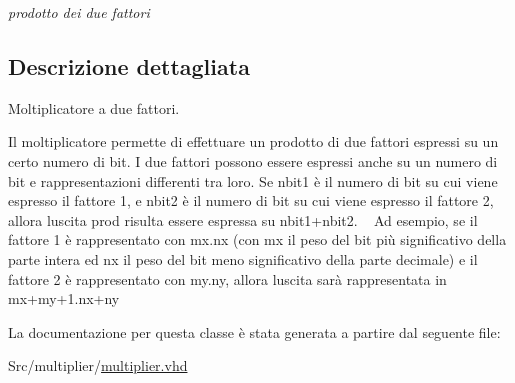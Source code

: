 \begin{DoxyCompactItemize}
\begin{DoxyCompactList}\small\item\em prodotto dei due fattori \end{DoxyCompactList}\end{DoxyCompactItemize}


\subsection{Descrizione dettagliata}
Moltiplicatore a due fattori.

Il moltiplicatore permette di effettuare un prodotto di due fattori espressi su un certo numero di bit. I due fattori possono essere espressi anche su un numero di bit e rappresentazioni differenti tra loro. Se nbit1 è il numero di bit su cui viene espresso il fattore 1, e nbit2 è il numero di bit su cui viene espresso il fattore 2, allora l\textquotesingle{}uscita prod risulta essere espressa su nbit1+nbit2. ~\newline
 Ad esempio, se il fattore 1 è rappresentato con mx.\+nx (con mx il peso del bit più significativo della parte intera ed nx il peso del bit meno significativo della parte decimale) e il fattore 2 è rappresentato con my.\+ny, allora l\textquotesingle{}uscita sarà rappresentata in mx+my+1.nx+ny 

La documentazione per questa classe è stata generata a partire dal seguente file\+:\begin{DoxyCompactItemize}
\item 
Src/multiplier/\hyperlink{multiplier_8vhd}{multiplier.\+vhd}\end{DoxyCompactItemize}
